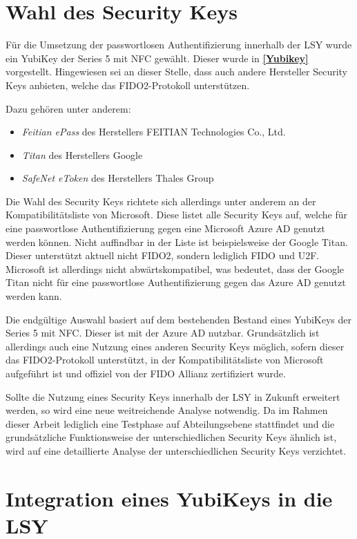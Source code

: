 \section{Wahl des Security Keys} \label{secwahl}
Für die Umsetzung der passwortlosen Authentifizierung innerhalb der \ac{LSY} wurde ein YubiKey der Series 5 mit NFC gewählt. Dieser wurde in \textbf{\ref{Yubikey}} vorgestellt. Hingewiesen sei an dieser Stelle, dass auch andere Hersteller Security Keys anbieten, welche das FIDO2-Protokoll unterstützen. 

Dazu gehören unter anderem:
\begin{itemize}
    \item \textit{Feitian ePass} des Herstellers FEITIAN Technologies Co., Ltd.
    \item \textit{Titan} des Herstellers Google
    \item \textit{SafeNet eToken} des Herstellers Thales Group
\end{itemize}

Die Wahl des Security Keys richtete sich allerdings unter anderem an der Kompatibilitätsliste \cite{compWin} von Microsoft. Diese listet alle Security Keys auf, welche für eine passwortlose Authentifizierung gegen eine Microsoft Azure \ac{AD} genutzt werden können. Nicht auffindbar in der Liste ist beispielsweise der Google Titan. Dieser unterstützt aktuell nicht FIDO2, sondern lediglich FIDO und \ac{U2F}. Microsoft ist allerdings nicht abwärtskompatibel, was bedeutet, dass der Google Titan nicht für eine passwortlose Authentifizierung gegen das Azure \ac{AD} genutzt werden kann.

Die endgültige Auswahl basiert auf dem bestehenden Bestand eines YubiKeys der Series 5 mit NFC. Dieser ist mit der Azure \ac{AD} nutzbar. Grundsätzlich ist allerdings auch eine Nutzung eines anderen Security Keys möglich, sofern dieser das \ac{FIDO}2-Protokoll unterstützt, in der Kompatibilitätsliste von Microsoft aufgeführt ist und offiziel von der \ac{FIDO} Allianz zertifiziert wurde.

Sollte die Nutzung eines Security Keys innerhalb der \ac{LSY} in Zukunft erweitert werden, so wird eine neue weitreichende Analyse notwendig. Da im Rahmen dieser Arbeit lediglich eine Testphase auf Abteilungsebene stattfindet und die grundsätzliche Funktionsweise der unterschiedlichen Security Keys ähnlich ist, wird auf eine detaillierte Analyse der unterschiedlichen Security Keys verzichtet.

\section{Integration eines YubiKeys in die LSY}

